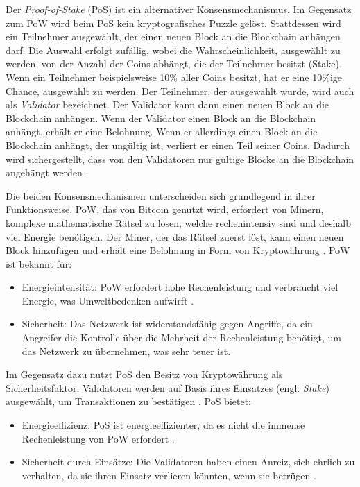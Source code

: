 Der \textit{Proof-of-Stake} (PoS) ist ein alternativer Konsensmechanismus. Im Gegensatz zum PoW wird beim PoS kein kryptografisches Puzzle gelöst. Stattdessen wird ein Teilnehmer ausgewählt, der einen neuen Block an die Blockchain anhängen darf. Die Auswahl erfolgt zufällig, wobei die Wahrscheinlichkeit, ausgewählt zu werden, von der Anzahl der Coins abhängt, die der Teilnehmer besitzt (Stake). Wenn ein Teilnehmer beispielsweise 10\% aller Coins besitzt, hat er eine 10\%ige Chance, ausgewählt zu werden. Der Teilnehmer, der ausgewählt wurde, wird auch als \textit{Validator} bezeichnet. Der Validator kann dann einen neuen Block an die Blockchain anhängen. Wenn der Validator einen Block an die Blockchain anhängt, erhält er eine Belohnung. Wenn er allerdings einen Block an die Blockchain anhängt, der ungültig ist, verliert er einen Teil seiner Coins. Dadurch wird sichergestellt, dass von den Validatoren nur gültige Blöcke an die Blockchain angehängt werden \parencites[S. 96-97]{Kapengut_EthereumTransitionToProofOfStake}[S. 34]{Meinel_BlockchainHypeInnovation}[S. 320-321]{Antonopoulos_MasteringEthereum}.

Die beiden Konsensmechanismen unterscheiden sich grundlegend in ihrer Funktionsweise. PoW, das von Bitcoin genutzt wird, erfordert von Minern, komplexe mathematische Rätsel zu lösen, welche rechenintensiv sind und deshalb viel Energie benötigen. Der Miner, der das Rätsel zuerst löst, kann einen neuen Block hinzufügen und erhält eine Belohnung in Form von Kryptowährung \parencite{Fill_BlockchainGrundlagen}. PoW ist bekannt für:

\begin{itemize}
    \item Energieintensität: PoW erfordert hohe Rechenleistung und verbraucht viel Energie, was Umweltbedenken aufwirft \parencite[S. 96-97]{Kapengut_EthereumTransitionToProofOfStake}.
    \item Sicherheit: Das Netzwerk ist widerstandsfähig gegen Angriffe, da ein Angreifer die Kontrolle über die Mehrheit der Rechenleistung benötigt, um das Netzwerk zu übernehmen, was sehr teuer ist.
\end{itemize}

\noindent Im Gegensatz dazu nutzt PoS den Besitz von Kryptowährung als Sicherheitsfaktor. Validatoren werden auf Basis ihres Einsatzes (engl. \textit{Stake}) ausgewählt, um Transaktionen zu bestätigen \parencites[S. 34]{Meinel_BlockchainHypeInnovation}[S. 320-321]{Antonopoulos_MasteringEthereum}. PoS bietet:

\begin{itemize}
    \item Energieeffizienz: PoS ist energieeffizienter, da es nicht die immense Rechenleistung von PoW erfordert \parencite[S. 96-97]{Kapengut_EthereumTransitionToProofOfStake}.
    \item Sicherheit durch Einsätze: Die Validatoren haben einen Anreiz, sich ehrlich zu verhalten, da sie ihren Einsatz verlieren könnten, wenn sie betrügen \parencites[S. 34]{Meinel_BlockchainHypeInnovation}[S. 320-321]{Antonopoulos_MasteringEthereum}.
\end{itemize}


